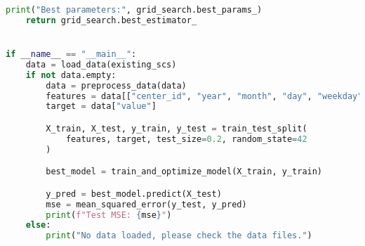 \documentclass[UTF8,a4paper,10 pt]{article}%
\begin{document}
\begin{lstlisting}[language=python]
    print("Best parameters:", grid_search.best_params_)
    return grid_search.best_estimator_


if __name__ == "__main__":
    data = load_data(existing_scs)
    if not data.empty:
        data = preprocess_data(data)
        features = data[["center_id", "year", "month", "day", "weekday"]]
        target = data["value"]

        X_train, X_test, y_train, y_test = train_test_split(
            features, target, test_size=0.2, random_state=42
        )

        best_model = train_and_optimize_model(X_train, y_train)

        y_pred = best_model.predict(X_test)
        mse = mean_squared_error(y_test, y_pred)
        print(f"Test MSE: {mse}")
    else:
        print("No data loaded, please check the data files.")
\end{lstlisting}
\end{document}
